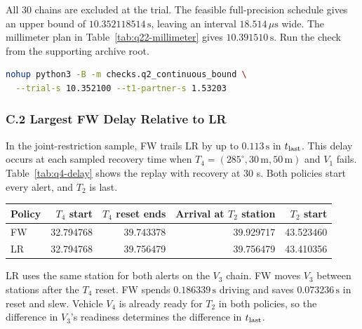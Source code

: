 \documentclass{swmcmthesis}
\begin{document}
All 30 chains are excluded at the trial. The feasible full-precision schedule gives an upper bound of \(10.352118514\,\mathrm s\), leaving an interval \(18.514\,\mu\mathrm s\) wide. The millimeter plan in Table~\ref{tab:q22-millimeter} gives \(10.391510\,\mathrm s\). Run the check from the supporting archive root.

\begin{lstlisting}[language=bash]
nohup python3 -B -m checks.q2_continuous_bound \
  --trial-s 10.352100 --t1-partner-s 1.53203
\end{lstlisting}

\clearpage
\subsubsection*{C.2 Largest FW Delay Relative to LR}
\label{app:q4-delay}

In the joint-restriction sample, FW trails LR by up to \(0.113\,\mathrm s\) in \(t_{\rm last}\). This delay occurs at each sampled recovery time when \(T_4=(285^\circ,30\,\mathrm m,50\,\mathrm m)\) and \(V_1\) fails. Table~\ref{tab:q4-delay} shows the replay with recovery at 30 s. Both policies start every alert, and \(T_2\) is last.

\begin{center}
    \begin{minipage}{\linewidth}
    \centering
    \captionsetup{type=table}
    \caption{Critical events of \(V_3\) in scenario \texttt{E7\_A285\_R30\_V1\_C30} under both outage restrictions. Times are in seconds.}
    \label{tab:q4-delay}
    \setlength{\tabcolsep}{4pt}
    \begin{tabular}{@{}lrrrr@{}}
        \toprule
        Policy & \(T_4\) start & \(T_4\) reset ends & Arrival at \(T_2\) station & \(T_2\) start \\
        \midrule
        FW & 32.794768 & 39.743378 & 39.929717 & 43.523460 \\
        LR & 32.794768 & 39.756479 & 39.756479 & 43.410356 \\
        \bottomrule
    \end{tabular}
    \end{minipage}
\end{center}

LR uses the same station for both alerts on the \(V_3\) chain. FW moves \(V_3\) between stations after the \(T_4\) reset. FW spends \(0.186339\,\mathrm s\) driving and saves \(0.073236\,\mathrm s\) in reset and slew. Vehicle \(V_4\) is already ready for \(T_2\) in both policies, so the difference in \(V_3\)'s readiness determines the difference in \(t_{\rm last}\).
\end{document}
